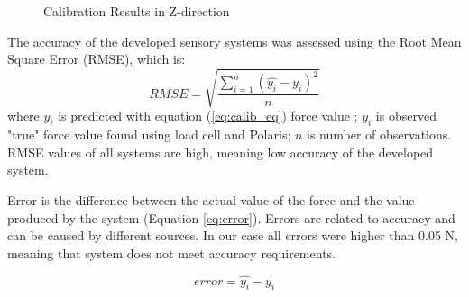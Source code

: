 \begin{figure}[h]%
\label{fig:Z_calib_res}%
\centering
{}%
\qquad
{}%
\caption{Calibration Results in Z-direction}
\end{figure}

The accuracy of the developed sensory systems was assessed using the Root Mean Square Error (RMSE), which is:
\begin{equation}
RMSE = \sqrt{\frac{\sum_{i=1}^{n}{{(\hat{y_i} - y_i)}^2}}{n}}
\end{equation}
where $\hat{y_i}$ is predicted with equation (\ref{eq:calib_eq}) force value ; $y_i$ is observed "true" force value found using load cell and Polaris; $n$ is number of observations.
RMSE values of all systems are high, meaning low accuracy of the developed system.

Error is the difference between the actual value of the force and the value produced by the system (Equation \ref{eq:error}). Errors are related to accuracy and can be caused by different sources. In our case all errors were higher than 0.05 N, meaning that system does not meet accuracy requirements.

\begin{equation}\label{eq:error}
error = \hat{y_i} - y_i
\end{equation}

